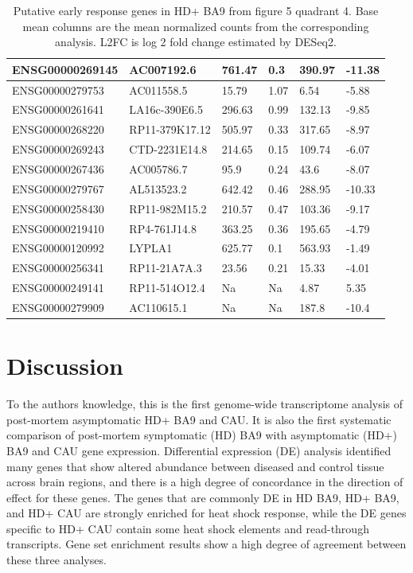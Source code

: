 \documentclass[fleqn,10pt,table]{wlscirep}
\begin{document}
\begin{table}[ht]
\begin{tabular}{|l|l|l|l|l|l|}
ENSG00000269145 & AC007192.6 & 761.47 & 0.3 & 390.97 & -11.38 \\ \hline
ENSG00000279753 & AC011558.5 & 15.79 & 1.07 & 6.54 & -5.88 \\ \hline
ENSG00000261641 & LA16c-390E6.5 & 296.63 & 0.99 & 132.13 & -9.85 \\ \hline
ENSG00000268220 & RP11-379K17.12 & 505.97 & 0.33 & 317.65 & -8.97 \\ \hline
ENSG00000269243 & CTD-2231E14.8 & 214.65 & 0.15 & 109.74 & -6.07 \\ \hline
ENSG00000267436 & AC005786.7 & 95.9 & 0.24 & 43.6 & -8.07 \\ \hline
ENSG00000279767 & AL513523.2 & 642.42 & 0.46 & 288.95 & -10.33 \\ \hline
ENSG00000258430 & RP11-982M15.2 & 210.57 & 0.47 & 103.36 & -9.17 \\ \hline
ENSG00000219410 & RP4-761J14.8 & 363.25 & 0.36 & 195.65 & -4.79 \\ \hline
ENSG00000120992 & LYPLA1 & 625.77 & 0.1 & 563.93 & -1.49 \\ \hline
ENSG00000256341 & RP11-21A7A.3 & 23.56 & 0.21 & 15.33 & -4.01 \\ \hline
ENSG00000249141 & RP11-514O12.4 & Na & Na & 4.87 & 5.35 \\ \hline
ENSG00000279909 & AC110615.1  & Na & Na & 187.8 & -10.4 \\ \hline
\end{tabular}
\caption{Putative early response genes in HD+ BA9 from figure 5 quadrant 4. Base mean columns are the mean normalized counts from the corresponding analysis. L2FC is log 2 fold change estimated by DESeq2. \label{tab:early_discordant_genes_IV}}
\end{table}

\section{Discussion}

To the authors knowledge, this is the first genome-wide transcriptome analysis of post-mortem asymptomatic HD+ BA9 and CAU.
It is also the first systematic comparison of post-mortem symptomatic (HD) BA9 with asymptomatic (HD+) BA9 and CAU gene expression.
Differential expression (DE) analysis identified many genes that show altered abundance between diseased and control tissue across brain regions, and there is a high degree of concordance in the direction of effect for these genes.
The genes that are commonly DE in HD BA9,  HD+ BA9, and HD+ CAU are strongly enriched for heat shock response, while the DE genes specific to HD+ CAU contain some heat shock elements and read-through transcripts.
Gene set enrichment results show a high degree of agreement between these three analyses.
\end{document}
